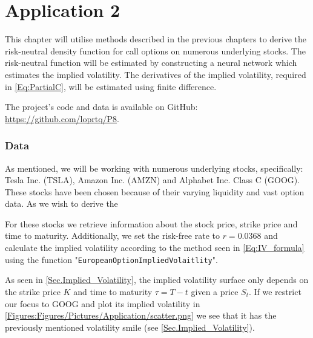 \chapter{Application 2}\label{Ch.6}
This chapter will utilise methods described in the previous chapters to derive the risk-neutral density function for call options on numerous underlying stocks. The risk-neutral function will be estimated by constructing a neural network which estimates the implied volatility. The derivatives of the implied volatility, required in \eqref{Eq:PartialC}, will be estimated using finite difference.

The project's code and data is available on GitHub:  \url{https://github.com/loprtq/P8}.


\subsection*{Data}
As mentioned, we will be working with numerous underlying stocks, specifically: Tesla Inc. (TSLA), Amazon Inc. (AMZN) and Alphabet Inc. Class C (GOOG). These stocks have been chosen because of their varying liquidity and vast option data. As we wish to derive the 


For these stocks we retrieve information about the stock price, strike price and time to maturity. Additionally, we set the risk-free rate to $r=0.0368$ and calculate the implied volatility according to the method seen in \eqref{Eq:IV_formula} using the function "\lstinline{EuropeanOptionImpliedVolaitlity}". 


As seen in \autoref{Sec.Implied_Volatility}, the implied volatility surface only depends on the strike price $K$ and time to maturity $\tau=T-t$ given a price $S_t$. If we restrict our focus to GOOG and plot its implied volatility in \autoref{Figures:Figures/Pictures/Application/scatter.png} we see that it has the previously mentioned volatility smile (see \autoref{Sec.Implied_Volatility}).
